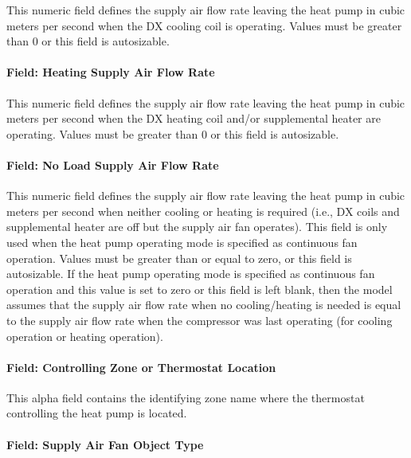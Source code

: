 This numeric field defines the supply air flow rate leaving the heat pump in cubic meters per second when the DX cooling coil is operating. Values must be greater than 0 or this field is autosizable.

\paragraph{Field: Heating Supply Air Flow Rate}\label{field-heating-supply-air-flow-rate-3-000}

This numeric field defines the supply air flow rate leaving the heat pump in cubic meters per second when the DX heating coil and/or supplemental heater are operating. Values must be greater than 0 or this field is autosizable.

\paragraph{Field: No Load Supply Air Flow Rate}\label{field-no-load-supply-air-flow-rate-3-000}

This numeric field defines the supply air flow rate leaving the heat pump in cubic meters per second when neither cooling or heating is required (i.e., DX coils and supplemental heater are off but the supply air fan operates). This field is only used when the heat pump operating mode is specified as continuous fan operation. Values must be greater than or equal to zero, or this field is autosizable. If the heat pump operating mode is specified as continuous fan operation and this value is set to zero or this field is left blank, then the model assumes that the supply air flow rate when no cooling/heating is needed is equal to the supply air flow rate when the compressor was last operating (for cooling operation or heating operation).

\paragraph{Field: Controlling Zone or Thermostat Location}\label{field-controlling-zone-or-thermostat-location-3}

This alpha field contains the identifying zone name where the thermostat controlling the heat pump is located.

\paragraph{Field: Supply Air Fan Object Type}\label{field-supply-air-fan-object-type}


